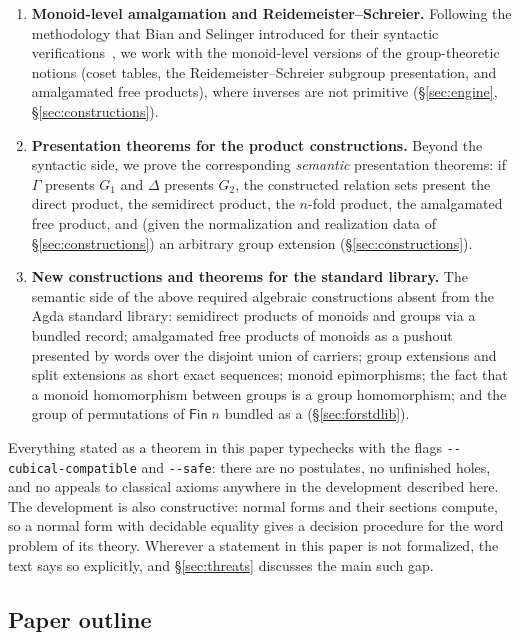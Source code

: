 \begin{enumerate}
\item[(3)] \textbf{Monoid-level amalgamation and Reidemeister--Schreier.}
  Following the methodology that Bian and Selinger introduced for their
  syntactic verifications~\cite{bian2023cliffordt2,bian2023cliffordcs3,
  bian2023thesis}, we work with the monoid-level versions of the
  group-theoretic notions (coset tables, the Reidemeister--Schreier
  subgroup presentation, and amalgamated free products), where inverses
  are not primitive (\S\ref{sec:engine}, \S\ref{sec:constructions}).

\item[(4)] \textbf{Presentation theorems for the product constructions.}
  Beyond the syntactic side, we prove the
  corresponding \emph{semantic} presentation theorems: if $\Gamma$ presents
  $G_1$ and $\Delta$ presents $G_2$, the constructed relation sets present
  the direct product, the semidirect product, the $n$-fold product, the
  amalgamated free product, and (given the normalization and realization data
  of \S\ref{sec:constructions}) an
  arbitrary group extension (\S\ref{sec:constructions}).

\item[(5)] \textbf{New constructions and theorems for the standard
  library.}  The semantic
  side of the above required algebraic constructions absent from the Agda
  standard library: semidirect products of monoids and groups via a bundled
   record; amalgamated free products of monoids as a pushout
  presented by words over the disjoint union of carriers; group extensions
  and split extensions as short exact sequences; monoid epimorphisms; the
  fact that a monoid homomorphism between groups is a group homomorphism;
  and the group of permutations of $\mathsf{Fin}\;n$ bundled as a
   (\S\ref{sec:forstdlib}).
\end{enumerate}

Everything stated as a theorem in this paper typechecks with the flags
\texttt{-{}-cubical-compatible} and \texttt{-{}-safe}: there are no
postulates, no unfinished holes, and no appeals to classical axioms
anywhere in the development described here.  The development is also
constructive: normal forms and their sections
compute, so a normal form with decidable equality gives a decision procedure
for the word problem of its theory.  Wherever a statement in this
paper is not formalized, the text says so explicitly, and
\S\ref{sec:threats} discusses the main such gap.

\subsection{Paper outline}

